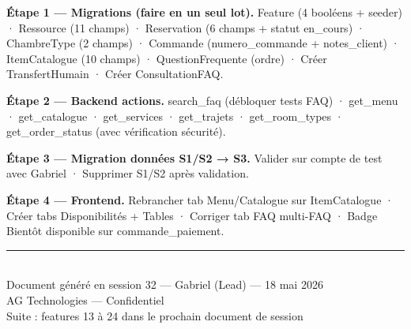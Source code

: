 \documentclass[11pt,a4paper]{article}
\begin{document}
\begin{notebox}
\textbf{Étape 1 — Migrations (faire en un seul lot).}
Feature (4 booléens + seeder) · Ressource (11 champs) · Reservation (6 champs +
statut en\_cours) · ChambreType (2 champs) · Commande (numero\_commande + notes\_client)
· ItemCatalogue (10 champs) · QuestionFrequente (ordre) · Créer TransfertHumain ·
Créer ConsultationFAQ.
\end{notebox}

\begin{notebox}
\textbf{Étape 2 — Backend actions.}
search\_faq (débloquer tests FAQ) · get\_menu · get\_catalogue · get\_services ·
get\_trajets · get\_room\_types · get\_order\_status (avec vérification sécurité).
\end{notebox}

\begin{notebox}
\textbf{Étape 3 — Migration données S1/S2 → S3.}
Valider sur compte de test avec Gabriel · Supprimer S1/S2 après validation.
\end{notebox}

\begin{notebox}
\textbf{Étape 4 — Frontend.}
Rebrancher tab Menu/Catalogue sur ItemCatalogue · Créer tabs Disponibilités + Tables ·
Corriger tab FAQ multi-FAQ · Badge Bientôt disponible sur commande\_paiement.
\end{notebox}

\vfill
\begin{center}
\color{AGTGray}
\rule{0.5\textwidth}{0.4pt}\\[0.5em]
{\small Document généré en session 32 — Gabriel (Lead) — 18 mai 2026}\\
{\small AG Technologies — Confidentiel}\\
{\small Suite : features 13 à 24 dans le prochain document de session}
\end{center}
\end{document}
